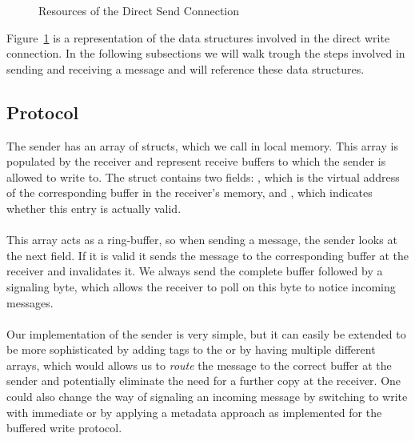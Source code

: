\begin{figure}[!htb]
\begin{center}
\end{center}
\caption{Resources of the Direct Send Connection}
\label{fig:dirwrite-resources}
\end{figure}

Figure~\ref{fig:dirwrite-resources} is a representation of the data structures involved in the direct write 
connection. In the following subsections we will walk trough the steps involved in sending and receiving a message and
will reference these data structures.

\subsection{Protocol}

The sender has an array of structs, which we call  in local memory. This array is populated by the 
receiver and represent receive buffers to which the sender is allowed to write to. The struct contains two fields: 
, which is the virtual address of the corresponding buffer in the receiver's memory, and , which 
indicates whether this entry is actually valid. 

\paragraph{} This array acts as a ring-buffer, so when sending a message, the sender looks at the next field. If it is
valid it sends the message to the corresponding buffer at the receiver and invalidates it. We always send the complete
buffer followed by a signaling byte, which allows the receiver to poll on this byte to notice incoming messages.

\paragraph{} Our implementation of the sender is very simple, but it can easily be extended to be more sophisticated by adding
tags to the  or by having multiple different arrays, which would allows us to \emph{route} the message to the
correct buffer at the sender and potentially eliminate the need for a further copy at the receiver. One could also change
the way of signaling an incoming message by switching to write with immediate or by applying a metadata approach as implemented
for the buffered write protocol.


